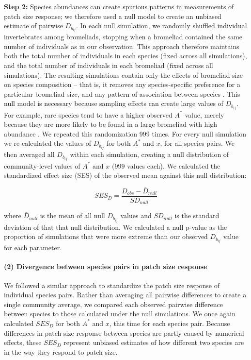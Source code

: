 \textbf{Step 2:} Species abundances can create spurious patterns in measurements of
patch size response; we therefore used a null model to create an
unbiased estimate of pairwise \(D_{b_{ij}}\). In each null simulation,
we randomly shuffled individual invertebrates among bromeliads, stopping
when a bromeliad contained the same number of individuals as in our
observation. This approach therefore maintains both the total number of
individuals in each species (fixed across all simulations), and the
total number of individuals in each bromeliad (fixed across all
simulations). The resulting simulations contain only the effects of
bromeliad size on species composition -- that is, it removes any
species-specific preference for a particular bromeliad size, and any
pattern of association between species \citep{Ulrich2012}. This null
model is necessary because sampling effects can create large values of
\(D_{b_{ij}}\). For example, rare species tend to have a higher observed
\(A^{*}\) value, merely because they are more likely to be found in a
large bromeliad with high abundance \citep{Srivastava2008}. We repeated
this randomization 999 times. For every null simulation we re-calculated
the values of \(D_{b_{ij}}\) for both \(A^{*}\) and \(x\), for all
species pairs. We then averaged all \(D_{b_{ij}}\) within each
simulation, creating a null distribution of community-level values of
\(A^{*}\) and \(x\) (999 values each). We calculated the standardized
effect size (SES) of the observed mean against this null distribution:

\[SES_{D} = \frac{D_{obs} - \bar{D}_{null}}{SD_{null}}\]

where \(\bar{D}_{null}\) is the mean of all null \(D_{b_{ij}}\) values
and \(SD_{null}\) is the standard deviation of that that null
distribution. We calculated a null p-value as the proportion of
simulations that were more extreme than our observed \(D_{b_{ij}}\)
value for each parameter.

\paragraph{(2) Divergence between species pairs in patch size
response}\label{divergence-between-species-pairs-in-patch-size-response}

We followed a similar approach to standardize the patch size response of
individual species pairs. Rather than averaging all pairwise differences
to create a single community average, we compared each observed pairwise
difference between species to those calculated under the null
simulations. We once again calculated \(SES_{D}\) for both \(A^{*}\) and
\(x\), this time for each species pair. Because differences in patch
size response between species are partly caused by numerical effects,
these \(SES_{D}\) represent unbiased estimates of how different two
species are in the way they respond to patch size.


